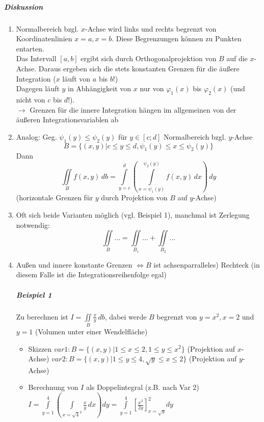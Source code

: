 \documentclass[a4paper]{scrartcl}
\begin{document}
\subparagraph{Diskussion}
\begin{enumerate}
\item Normalbereich bzgl. $x$-Achse wird links und rechts begrenzt von Koordinatenlinien $x=a,x=b$. Diese Begrenzungen können zu Punkten entarten.\\
Das Intervall $[a,b]$ ergibt sich durch Orthogonalprojektion von $B$ auf die $x$-Achse. Daraus ergeben sich die stets konstanten Grenzen für die äußere Integration ($x$ läuft von $a$ bis $b$!)\\
Dagegen läuft $y$ in Abhängigkeit von $x$ nur von $\varphi_1(x)$ bis $\varphi_2(x)$ (und nicht von $c$ bis $d$!).\\
$\rightarrow$ Grenzen für die innere Integration hängen im allgemeinen von der äußeren Integrationsvariablen ab
\item Analog: Geg. $\psi_1 (y) \leq \psi_2 (y)$ für $y \in [c;d]$ Normalbereich bzgl. $y$-Achse \[B=\{ (x,y) | c \leq y \leq d, \psi_1(y) \leq x \leq \psi_2(y) \} \]
Dann \[\iint\limits_{B} f(x,y) \, db = \int\limits_{y=c}^d \left ( \int\limits_{x=\psi_1(y)}^{\psi_2 (y)} f(x,y) \, dx \right ) \, dy\] (horizontale Grenzen für $y$ durch Projektion von $B$ auf $y$-Achse)
\item Oft sich beide Varianten möglich (vgl. Beispiel 1), manchmal ist Zerlegung notwendig:
\[ \iint\limits_{B} \dots = \iint\limits_{B_1} \dots + \iint\limits_{B_2} \dots \]
\item Außen und innere konstante Grenzen $\Leftrightarrow B$ ist achsenparralleles) Rechteck (in diesem Falle ist die Integrationsreihenfolge egal)

\subparagraph{Beispiel 1} Zu berechnen ist $I = \iint\limits_{B} \frac{x}{y} \, db$, dabei werde $B$ begrenzt von $y=x^2, x=2$ und $y=1$ (Volumen unter einer Wendelfläche)
\begin{itemize}
\item Skizzen %
$var 1: B= \{ (x,y) | 1 \leq x \leq 2 , 1 \leq y \leq x^2 \}$ (Projektion auf $x$-Achse)
$var 2: B= \{ (x,y) | 1 \leq y \leq 4 , \sqrt{y} \leq x \leq 2 \}$ (Projektion auf $y$-Achse)
\item Berechnung von $I$ als Doppelintegral (z.B. nach Var 2)\\
$I = \int\limits_{y=1}^{4} (\int\limits_{x=\sqrt{4}^2} \frac{x}{y} \, dx)dy = \int\limits_{y=1}^4 \left [ \frac{x^2}{2y} \right ]_{x = \sqrt{y}}^2 dy$
\end{itemize}
\end{enumerate}
\end{document}
